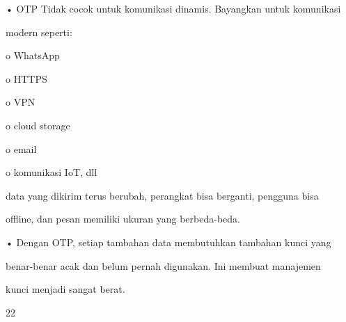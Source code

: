 \documentclass{article}
\begin{document}

• OTP Tidak cocok untuk komunikasi dinamis. Bayangkan untuk komunikasi 

modern seperti:

o WhatsApp 

o HTTPS 

o VPN 

o cloud storage 

o email 

o komunikasi IoT, dll 

   data yang dikirim terus berubah, perangkat bisa berganti, pengguna bisa 

offline, dan pesan memiliki ukuran yang berbeda-beda.

• Dengan OTP, setiap tambahan data membutuhkan tambahan kunci yang 

benar-benar acak dan belum pernah digunakan. Ini membuat manajemen 

kunci menjadi sangat berat.

22
\end{document}
